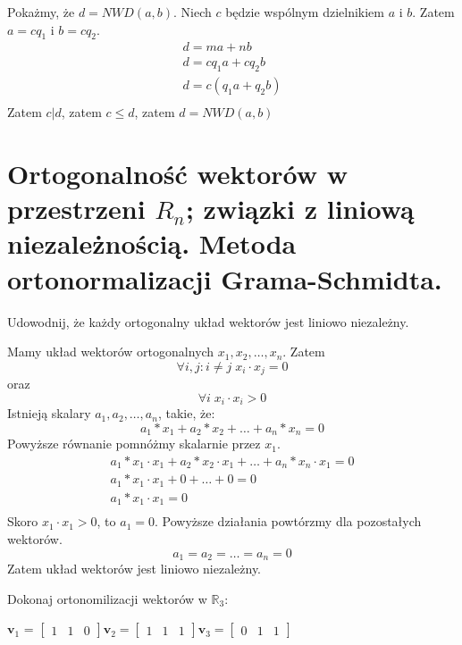 \documentclass[12pt]{article}
\begin{document}
    Pokażmy, że $d = NWD(a, b)$. Niech $c$ będzie wspólnym dzielnikiem $a$ i $b$. Zatem $a = cq_1$ i $b = cq_2$.
    \begin{gather*}
        d = ma + nb\\
        d = cq_1a + cq_2b\\
        d = c(q_1a + q_2b)\\
    \end{gather*}
    Zatem $c | d$, zatem $c \leq d$, zatem $d = NWD(a, b)$

    \section{Ortogonalność wektorów w przestrzeni $R_n$; związki z liniową niezależnością. Metoda ortonormalizacji Grama-Schmidta.}

    \begin{exercise}
        Udowodnij, że każdy ortogonalny układ wektorów jest liniowo niezależny.
    \end{exercise}

    Mamy układ wektorów ortogonalnych  $x_1, x_2 ,\dots, x_n$. Zatem \[\forall i,j: i \neq j \; x_i \cdot x_j = 0\] oraz \[\forall i \; x_i \cdot x_i > 0\]
    Istnieją skalary $a_1, a_2 ,\dots, a_n$, takie, że: \[a_1 * x_1 + a_2 * x_2 + \ldots + a_n * x_n = 0\]
    Powyższe równanie pomnóżmy skalarnie przez $x_1$.
    \begin{gather*}
        a_1 * x_1 \cdot x_1 + a_2 * x_2 \cdot x_1 + \ldots + a_n * x_n \cdot x_1 = 0\\
        a_1 * x_1 \cdot x_1 + 0 + \ldots + 0 = 0\\
        a_1 * x_1 \cdot x_1 = 0\\
    \end{gather*}
    Skoro $x_1 \cdot x_1 > 0$, to $a_1 = 0$. Powyższe działania powtórzmy dla pozostałych wektorów.
    \[a_1 = a_2 = \ldots = a_n = 0\]
    Zatem układ wektorów jest liniowo niezależny.
    \begin{exercise}
        Dokonaj ortonomilizacji wektorów w $\mathbb{R}_3$:

        $\mathbf{v}_1$ =
        $\begin{bmatrix}
             1 & 1 & 0
        \end{bmatrix}
        \mathbf{v}_2 =
        \begin{bmatrix}
            1 & 1 & 1
        \end{bmatrix}
        \mathbf{v}_3 =
        \begin{bmatrix}
            0 & 1 & 1
        \end{bmatrix}$
    \end{exercise}
\end{document}
